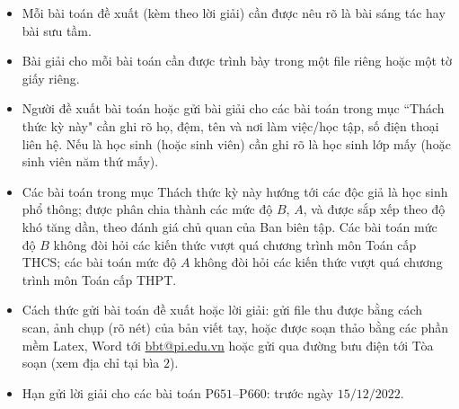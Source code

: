 \thispagestyle{thachthuctoanhocnone}
\pagestyle{thachthuctoanhoc}
\everymath{\color{thachthuctoanhoc}}
\graphicspath{{../thachthuctoanhoc/pic/}}
\begingroup
{}
\centering
\vspace*{4cm}
\endgroup
\vspace*{-8pt}
\begin{tBox}
	\begin{itemize}[leftmargin = 13pt, itemsep = 1.0pt] 
		\item Mỗi bài toán đề xuất (kèm theo lời giải) cần được nêu rõ là bài sáng tác hay bài sưu tầm.
		\item Bài giải cho mỗi bài toán cần được trình bày trong một file riêng hoặc
		một tờ giấy riêng.
		\item  Người đề xuất bài toán hoặc gửi bài giải cho các bài toán trong mục ``Thách thức kỳ này" cần ghi rõ họ, đệm, tên và nơi làm việc/học tập, số điện thoại liên hệ. Nếu là học sinh (hoặc sinh viên) cần ghi rõ là học sinh lớp mấy (hoặc sinh viên năm thứ mấy).
		\item Các bài toán trong mục Thách thức kỳ này hướng tới các độc giả là học sinh phổ thông; được phân chia thành các mức độ $B$, $A$, và được sắp xếp theo độ khó tăng dần, theo đánh giá chủ quan của Ban biên tập. Các bài toán mức độ $B$ không đòi hỏi các kiến thức vượt quá chương trình môn Toán cấp THCS; các bài toán mức độ $A$ không đòi hỏi các kiến thức vượt quá chương trình môn Toán cấp THPT.
		\item Cách thức gửi bài toán đề xuất hoặc lời giải: gửi file thu được bằng cách scan, ảnh chụp (rõ nét) của bản viết tay, hoặc được soạn thảo bằng các phần mềm Latex, Word tới \url{bbt@pi.edu.vn} hoặc gửi qua đường bưu điện tới Tòa soạn (xem địa chỉ tại bìa $2$).
		\item Hạn gửi lời giải cho các bài toán P$651$--P$660$: trước ngày $15/12/2022$.
	\end{itemize}
\end{tBox}

